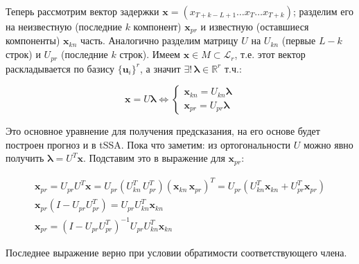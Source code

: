			 Теперь рассмотрим вектор задержки $ \mathbf{x} = (x_{T + k - L + 1} \ldots x_T \ldots x_{T + k}) $; разделим его на неизвестную (последние $ k $ компонент) $ \mathbf{x}_{pr} $ и известную (оставшиеся компоненты) $ \mathbf{x}_{kn} $ часть. Аналогично разделим матрицу $ U $ на $ U_{kn} $ (первые $ L - k $ строк) и $ U_{pr} $ (последние $ k $ строк). Имеем $ \mathbf{x} \in M \subset \mathcal{L}_r $, т.е. этот вектор раскладывается по базису $ \{\mathbf{u}_i\}^r $, а значит $ \exists! \, \boldsymbol{\lambda} \in \mathbb{R}^r $ т.ч.:
			 
			 \begin{equation}\label{eq:pred_main}
			 	\mathbf{x} = U \boldsymbol{\lambda} \Leftrightarrow \begin{cases*}
			 		\mathbf{x}_{kn} = U_{kn} \boldsymbol{\lambda} \\
			 		\mathbf{x}_{pr} = U_{pr} \boldsymbol{\lambda}
			 	\end{cases*}
			 \end{equation}
			 
			 Это основное уравнение для получения предсказания, на его основе будет построен прогноз и в tSSA. Пока что заметим: из ортогональности $ U $ можно явно получить $ \boldsymbol{\lambda} = U^T \mathbf{x} $. Подставим это в выражение для $ \mathbf{x}_{pr} $:
			 
			 \begin{gather}
			 	\mathbf{x}_{pr} = U_{pr} U^T \mathbf{x} =  U_{pr} (U_{kn}^T \, U_{pr}^T) (\mathbf{x}_{kn} \, \mathbf{x}_{pr})^T = U_{pr} (U_{kn}^T \mathbf{x}_{kn} + U_{pr}^T \mathbf{x}_{pr}) \nonumber \\
			 	\mathbf{x}_{pr} (I -  U_{pr}  U_{pr}^T) =  U_{pr}  U_{kn}^T \mathbf{x}_{kn} \nonumber \\
			 	\mathbf{x}_{pr} = (I -  U_{pr}  U_{pr}^T)^{-1} U_{pr}  U_{kn}^T \mathbf{x}_{kn}\label{eq:pred_sol_1}
			 \end{gather}
			 
			 Последнее выражение верно при условии обратимости соответствующего члена. \smallskip
			 
